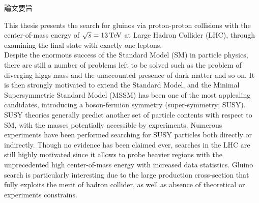 \setlength{\topmargin}{-1.5cm}
\setlength{\oddsidemargin}{-0.3cm}
\setlength{\evensidemargin}{-0.3cm}
\setlength{\textwidth}{16.5cm}
\setlength{\textheight}{23cm}



%



\begin{center}
論文要旨
\end{center}

This thesis presents the search for gluinos via proton-proton collisions with the center-of-mass energy of $\sqrt{s}=13\, \mathrm{TeV}$ at Large Hadron Collider (LHC), through examining the final state with exactly one leptons.  \\

Despite the enormous success of the Standard Model (SM) in particle physics, there are still a number of problems left to be solved such as the problem of diverging higgs mass and the unaccounted presence of dark matter and so on.
It is then strongly motivated to extend the Standard Model, and the Minimal Supersymmetric Standard Model (MSSM) has been one of the most applealing candidates, introducing a boson-fermion symmetry (super-symmetry; SUSY). 
SUSY theories generally predict another set of particle contents with respect to SM, with the masses potentially accessible by experiments.
Numerous experiments have been performed searching for SUSY particles both directly or indirectly.
Though no evidence has been claimed ever, searches in the LHC are still highly motivated since it allows to probe heavier regions with the unprecedented high center-of-mass energy with increased data statistics.
Gluino search is particularly interesting due to the large production cross-section that fully exploits the merit of hadron collider, as well as absence of theoretical or experiments constrains. \\

